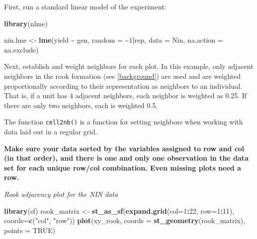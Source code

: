 \documentclass[
]{book}
\newenvironment{Shaded}{\begin{snugshade}}{\end{snugshade}}
\newcommand{\AttributeTok}[1]{\textcolor[rgb]{0.13,0.29,0.53}{#1}}
\newcommand{\ConstantTok}[1]{\textcolor[rgb]{0.56,0.35,0.01}{#1}}
\newcommand{\DecValTok}[1]{\textcolor[rgb]{0.00,0.00,0.81}{#1}}
\newcommand{\FunctionTok}[1]{\textcolor[rgb]{0.13,0.29,0.53}{\textbf{#1}}}
\newcommand{\NormalTok}[1]{#1}
\newcommand{\OtherTok}[1]{\textcolor[rgb]{0.56,0.35,0.01}{#1}}
\newcommand{\SpecialCharTok}[1]{\textcolor[rgb]{0.81,0.36,0.00}{\textbf{#1}}}
\newcommand{\StringTok}[1]{\textcolor[rgb]{0.31,0.60,0.02}{#1}}
\begin{document}
First, run a standard linear model of the experiment:

\begin{Shaded}
\begin{Highlighting}[]
\FunctionTok{library}\NormalTok{(nlme)}

\NormalTok{nin.lme }\OtherTok{\textless{}{-}} \FunctionTok{lme}\NormalTok{(yield }\SpecialCharTok{\textasciitilde{}}\NormalTok{ gen, }\AttributeTok{random =} \SpecialCharTok{\textasciitilde{}}\DecValTok{1}\SpecialCharTok{|}\NormalTok{rep,}
              \AttributeTok{data =}\NormalTok{ Nin,}
              \AttributeTok{na.action =}\NormalTok{ na.exclude)}
\end{Highlighting}
\end{Shaded}

Next, establish and weight neighbors for each plot. In this example, only adjacent neighbors in the rook formation (see \ref{background}) are used and are weighted proportionally according to their representation as neighbors to an individual. That is, if a unit has 4 adjacent neighbors, each neighbor is weighted as 0.25. If there are only two neighbors, each is weighted 0.5.

The function \texttt{cell2nb()} is a function for setting neighbors when working with data laid out in a regular grid.

\begin{Shaded}
\end{Shaded}

\textbf{Make sure your data sorted by the variables assigned to row and col (in that order), and there is one and only one observation in the data set for each unique row/col combination. Even missing plots need a row.}

\emph{Rook adjacency plot for the NIN data}

\begin{Shaded}
\begin{Highlighting}[]
\FunctionTok{library}\NormalTok{(sf)}
\NormalTok{rook\_matrix }\OtherTok{\textless{}{-}} \FunctionTok{st\_as\_sf}\NormalTok{(}\FunctionTok{expand.grid}\NormalTok{(}\AttributeTok{col=}\DecValTok{1}\SpecialCharTok{:}\DecValTok{22}\NormalTok{, }\AttributeTok{row=}\DecValTok{1}\SpecialCharTok{:}\DecValTok{11}\NormalTok{), }\AttributeTok{coords=}\FunctionTok{c}\NormalTok{(}\StringTok{"col"}\NormalTok{, }\StringTok{"row"}\NormalTok{))}
\FunctionTok{plot}\NormalTok{(xy\_rook, }\AttributeTok{coords =} \FunctionTok{st\_geometry}\NormalTok{(rook\_matrix), }\AttributeTok{points =} \ConstantTok{TRUE}\NormalTok{)}
\end{Highlighting}
\end{Shaded}
\end{document}

